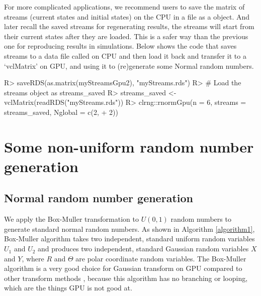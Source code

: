 \documentclass[article,nojss]{jss}\usepackage[]{graphicx}\usepackage[]{color}
\begin{document}
For more complicated applications, we recommend users to save the matrix of streams (current states and initial states) on the CPU in a file as a  object. And later recall the saved streams for regenerating results, the streams will start from their current states after they are loaded. This is a safer way than the previous one for reproducing results in simulations. Below shows the code that saves streams to a data file called  on CPU and then load it back and transfer it to a `vclMatrix'  on GPU, and using it to (re)generate some Normal random numbers.
\begin{CodeChunk}
\begin{CodeInput}
R> saveRDS(as.matrix(myStreamsGpu2), "myStreams.rds")
R> # Load the streams object as streams_saved
R> streams_saved <- vclMatrix(readRDS("myStreams.rds"))
R> clrng::rnormGpu(n = 6, streams = streams_saved, Nglobal = c(2,
+    2))
\end{CodeInput} 
\end{CodeChunk} 









\section{Some non-uniform random number generation}
\subsection{Normal random number generation}
We apply the Box-Muller transformation to $U(0,1)$ random numbers to generate standard normal random numbers. As shown in Algorithm \ref{algorithm1}, Box-Muller algorithm takes two independent, standard uniform random variables $U_1$ and $U_2$ and produces two independent, standard Gaussian random variables $X$ and $Y$, where $R$ and $\Theta$ are polar coordinate random variables. %
The Box-Muller algorithm is a very good choice for Gaussian transform on GPU compared to other transform methods \citep{howes2007efficient}, because this algorithm has no branching or looping, which are the things GPU is not good at. %
\end{document}
